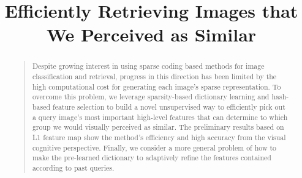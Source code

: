 \documentclass[letterpaper]{article}
\begin{document}
\title{Efficiently Retrieving Images that We Perceived as Similar}
\maketitle
\begin{abstract}
\begin{quote}
Despite growing interest in using sparse coding based methods for image classification and retrieval, progress in this direction has been limited by the high computational cost for generating each image's sparse representation. To overcome this problem, we leverage sparsity-based dictionary learning and hash-based feature selection to build a novel unsupervised way to efficiently pick out a query image's most important high-level features that can determine to which group we would visually perceived as similar. The preliminary results based on L1 feature map show the method's efficiency and high accuracy from the visual cognitive perspective. Finally, we consider a more general problem of how to make the pre-learned dictionary to adaptively refine the features contained according to past queries.
\end{quote}
\end{abstract}
\end{document}
